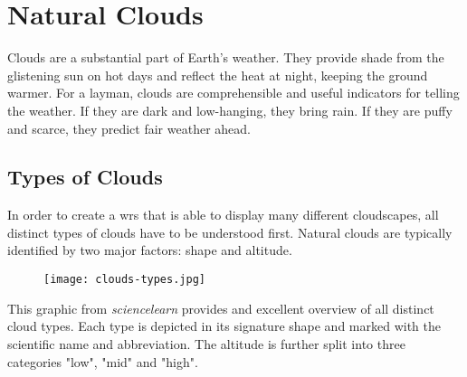 \section{Natural Clouds}
Clouds are a substantial part of Earth's weather. They provide shade from the glistening sun on hot days and reflect the heat at night, keeping the ground warmer.
For a layman, clouds are comprehensible and useful indicators for telling the weather. If they are dark and low-hanging, they bring rain. If they are puffy and scarce, they predict fair weather ahead.

\subsection{Types of Clouds}
In order to create a \gls{wrs} that is able to display many different cloudscapes, all distinct types of clouds have to be understood first.
Natural clouds are typically identified by two major factors: shape and \gls{altitude}.

\begin{figure}[H]
    \texttt{[image: clouds-types.jpg]}
    \label{img:ui:mockup:live}
\end{figure}

\noindent
This graphic from \emph{sciencelearn} provides and excellent overview of all distinct cloud types.
Each type is depicted in its signature shape and marked with the scientific name and abbreviation.
The \gls{altitude} is further split into three categories "low", "mid" and "high". 
